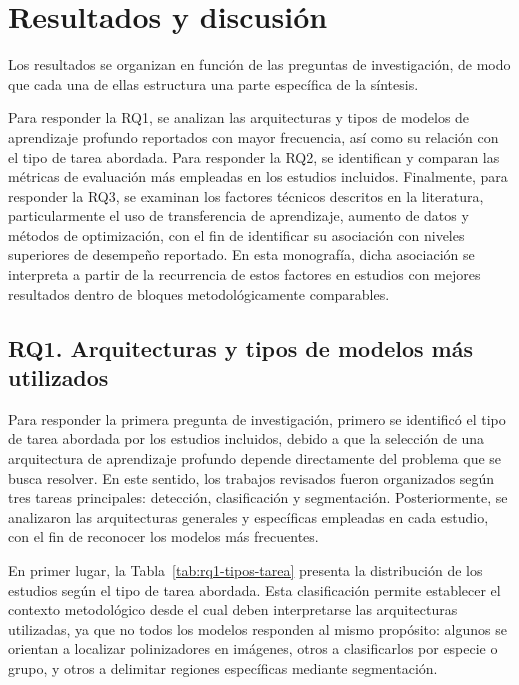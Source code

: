 \chapter{Resultados y discusión}

Los resultados se organizan en función de las preguntas de investigación, de modo que cada una de ellas estructura una parte específica de la síntesis.

Para responder la RQ1, se analizan las arquitecturas y tipos de modelos de aprendizaje profundo reportados con mayor frecuencia, así como su relación con el tipo de tarea abordada. Para responder la RQ2, se identifican y comparan las métricas de evaluación más empleadas en los estudios incluidos. Finalmente, para responder la RQ3, se examinan los factores técnicos descritos en la literatura, particularmente el uso de transferencia de aprendizaje, aumento de datos y métodos de optimización, con el fin de identificar su asociación con niveles superiores de desempeño reportado. En esta monografía, dicha asociación se interpreta a partir de la recurrencia de estos factores en estudios con mejores resultados dentro de bloques metodológicamente comparables.

\section{RQ1. Arquitecturas y tipos de modelos más utilizados}

Para responder la primera pregunta de investigación, primero se identificó el tipo de tarea abordada por los estudios incluidos, debido a que la selección de una arquitectura de aprendizaje profundo depende directamente del problema que se busca resolver. En este sentido, los trabajos revisados fueron organizados según tres tareas principales: detección, clasificación y segmentación. Posteriormente, se analizaron las arquitecturas generales y específicas empleadas en cada estudio, con el fin de reconocer los modelos más frecuentes.

En primer lugar, la Tabla~\ref{tab:rq1-tipos-tarea} presenta la distribución de los estudios según el tipo de tarea abordada. Esta clasificación permite establecer el contexto metodológico desde el cual deben interpretarse las arquitecturas utilizadas, ya que no todos los modelos responden al mismo propósito: algunos se orientan a localizar polinizadores en imágenes, otros a clasificarlos por especie o grupo, y otros a delimitar regiones específicas mediante segmentación.



